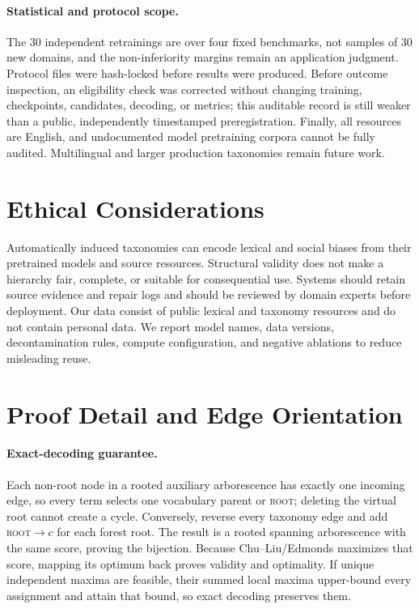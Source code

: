 \documentclass[11pt]{article}
\newcommand{\rootnode}{\textsc{root}}
\begin{document}
\paragraph{Statistical and protocol scope.}
The 30 independent retrainings are over four fixed benchmarks, not samples
of 30 new domains, and the non-inferiority margins remain an application
judgment. Protocol files were hash-locked before results were produced. Before
outcome inspection, an eligibility check was corrected without changing
training, checkpoints, candidates, decoding, or metrics; this auditable record
is still weaker than a public, independently timestamped preregistration. Finally, all
resources are English, and undocumented model pretraining corpora cannot be
fully audited. Multilingual and larger production taxonomies remain future
work.

\section*{Ethical Considerations}

Automatically induced taxonomies can encode lexical and social biases from
their pretrained models and source resources.  Structural validity does not
make a hierarchy fair, complete, or suitable for consequential use.  Systems
should retain source evidence and repair logs and should be reviewed by
domain experts before deployment.  Our data consist of public lexical and
taxonomy resources and do not contain personal data.  We report model names,
data versions, decontamination rules, compute configuration, and negative
ablations to reduce misleading reuse.



\appendix

\section{Proof Detail and Edge Orientation}
\label{app:projection-proofs}

\paragraph{Exact-decoding guarantee.}
Each non-root node in a rooted auxiliary arborescence has exactly one incoming
edge, so every term selects one vocabulary parent or \rootnode{}; deleting the
virtual root cannot create a cycle. Conversely, reverse every taxonomy edge
and add \rootnode$\rightarrow c$ for each forest root. The result is a rooted
spanning arborescence with the same score, proving the bijection. Because
Chu--Liu/Edmonds maximizes that score, mapping its optimum back proves validity
and optimality. If unique independent maxima are feasible, their summed local
maxima upper-bound every assignment and attain that bound, so exact decoding
preserves them.
\end{document}
